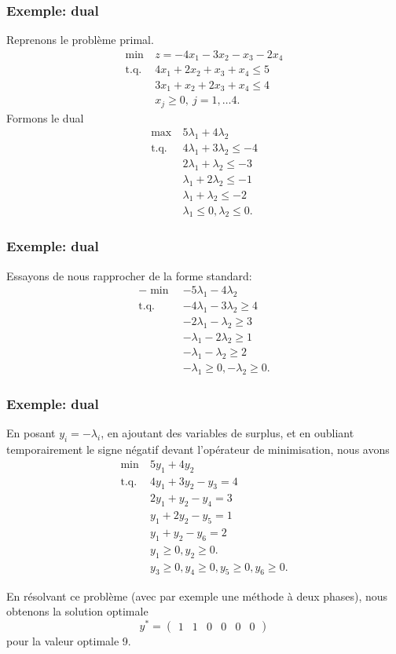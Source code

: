 \documentclass[usepdftitle=false]{beamer}
\begin{document}
\begin{frame}
\frametitle{Exemple: dual}

Reprenons le problème primal.
\begin{align*}
\min\ &z = -4x_1 - 3x_2 -x_3 -2x_4 \\
\mbox{t.q. } & 4x_1 + 2x_2 + x_3 + x_4 \leq 5 \\
& 3x_1 + x_2 + 2x_3 + x_4 \leq 4 \\
& x_j \geq 0,\ j = 1,\ldots 4.
\end{align*}
Formons le dual
\begin{align*}
\max\ & 5\lambda_1 + 4\lambda_2 \\
\mbox{t.q. } &
4\lambda_1 + 3\lambda_2 \leq -4 \\
& 2\lambda_1 + \lambda_2 \leq -3 \\
& \lambda_1 + 2\lambda_2 \leq -1 \\
& \lambda_1 + \lambda_2 \leq -2 \\
& \lambda_1 \leq 0, \lambda_2 \leq 0.
\end{align*}

\end{frame}

\begin{frame}
\frametitle{Exemple: dual}

Essayons de nous rapprocher de la forme standard:
\begin{align*}
-\min\ & -5\lambda_1 - 4\lambda_2 \\
\mbox{t.q. } &
-4\lambda_1 - 3\lambda_2 \geq 4 \\
& -2\lambda_1 - \lambda_2 \geq 3 \\
& -\lambda_1 - 2\lambda_2 \geq 1 \\
& -\lambda_1 - \lambda_2 \geq 2 \\
& -\lambda_1 \geq 0, -\lambda_2 \geq 0.
\end{align*}

\end{frame}

\begin{frame}
\frametitle{Exemple: dual}

En posant $y_i = -\lambda_i$, en ajoutant des variables de surplus, et en oubliant temporairement le signe négatif devant l'opérateur de minimisation, nous avons
\begin{align*}
\min\ & 5y_1 + 4y_2 \\
\mbox{t.q. } &
4y_1 + 3y_2 - y_3 = 4 \\
& 2y_1 + y_2 - y_4 = 3 \\
& y_1 + 2y_2 - y_5 = 1 \\
& y_1 + y_2 -y_6 = 2 \\
& y_1 \geq 0, y_2 \geq 0.\\
& y_3 \geq 0, y_4 \geq 0, y_5 \geq 0, y_6 \geq 0.
\end{align*}

En résolvant ce problème (avec par exemple une méthode à deux phases), nous obtenons la solution optimale
\[
y^* =
\begin{pmatrix}
1 & 1 & 0 & 0 & 0 & 0
\end{pmatrix}
\]
pour la valeur optimale 9.

\end{frame}
\end{document}
